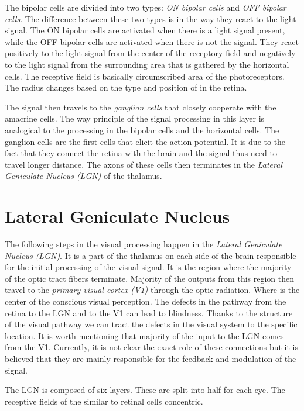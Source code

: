 The bipolar cells are divided into two types: \emph{ON bipolar cells} and 
\emph{OFF bipolar cells}. The difference between these two types is in the 
way they react to the light signal. The ON bipolar cells are activated when there
is a light signal present, while the OFF bipolar cells are activated when there is not
the signal. They react positively to the light signal from the center of the receptory
field and negatively to the light signal from the surrounding area that is gathered by the
horizontal cells. The receptive field is basically circumscribed area of the photoreceptors. The 
radius changes based on the type and position of in the retina.

The signal then travels to the \emph{ganglion cells} that closely cooperate with the 
amacrine cells. The way principle of the signal processing in this layer is analogical to 
the processing in the bipolar cells and the horizontal cells. The ganglion cells are the 
first cells that elicit the action potential. It is due to the fact that they connect the
retina with the brain and the signal thus need to travel longer distance. The axons of these
cells then terminates in the \emph{Lateral Geniculate Nucleus (LGN)} of the thalamus.

\section{Lateral Geniculate Nucleus}
\label{sec:lgn}
The following steps in the visual processing happen in the 
\emph{Lateral Geniculate Nucleus (LGN)}. It is a part of the thalamus on each side of the 
brain responsible for the initial processing of the visual signal. It is the region where
the majority of the optic tract fibers terminate. Majority of the outputs from this region
then travel to the \emph{primary visual cortex (V1)} through the optic radiation. Where is
the center of the conscious visual perception. The defects in the pathway from the retina 
to the LGN and to the V1 can lead to blindness. Thanks to the structure of the visual
pathway we can tract the defects in the visual system to the specific location. It 
is worth mentioning that majority of the input to the LGN comes from the V1. Currently, 
it is not clear the exact role of these connections but it is believed that they are mainly
responsible for the feedback and modulation of the signal.

The LGN is composed of six layers. These are split into half for each eye. The receptive
fields of the similar to retinal cells concentric.

